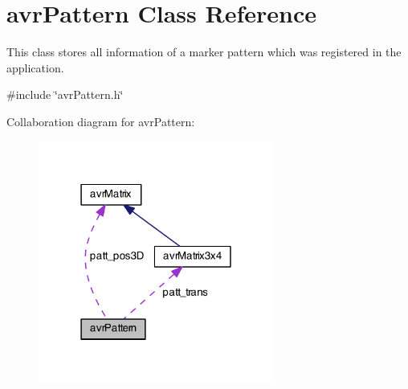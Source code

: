 \hypertarget{classavr_pattern}{\section{avr\-Pattern Class Reference}
\label{classavr_pattern}
}


This class stores all information of a marker pattern which was registered in the application.  




{\ttfamily \#include \char`\"{}avr\-Pattern.\-h\char`\"{}}



Collaboration diagram for avr\-Pattern\-:\nopagebreak
\begin{figure}[H]
\begin{center}
\leavevmode
\includegraphics[width=219pt]{classavr_pattern__coll__graph}
\end{center}
\end{figure}
